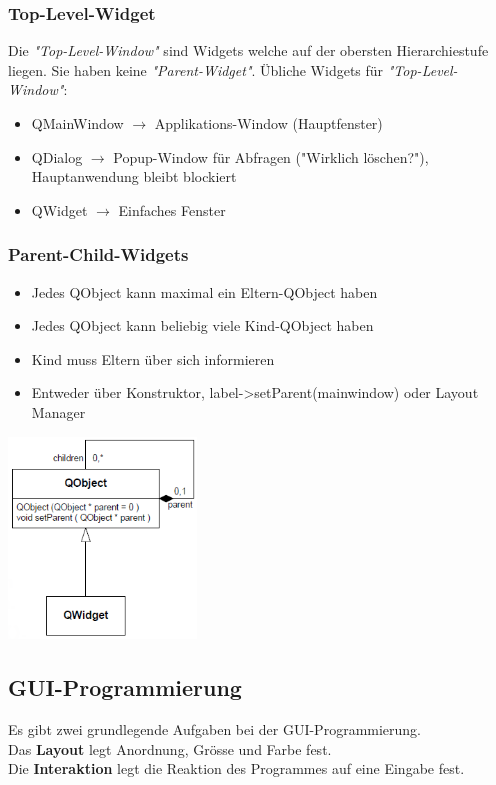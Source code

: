 \begin{multicols}{3}
\subsubsection{Top-Level-Widget}
Die \textit{"Top-Level-Window"} sind Widgets welche auf der obersten Hierarchiestufe liegen. Sie haben keine \textit{"Parent-Widget"}.\newline
Übliche Widgets für \textit{"Top-Level-Window"}: 
\begin{itemize}
	\item QMainWindow $\rightarrow$ Applikations-Window (Hauptfenster)
	\item QDialog $\rightarrow$ Popup-Window für Abfragen ("Wirklich löschen?"), Hauptanwendung bleibt blockiert
	\item QWidget $\rightarrow$ Einfaches Fenster
\end{itemize}

\subsubsection{Parent-Child-Widgets}
\begin{itemize}
	\item Jedes QObject kann maximal ein Eltern-QObject haben
	\item Jedes QObject kann beliebig viele \newline Kind-QObject haben
	\item Kind muss Eltern über sich informieren
	\item Entweder über Konstruktor, \newline label->setParent(mainwindow) oder Layout Manager
\end{itemize}

\includegraphics[width=5cm]{images/qt_parent_child.png}
\end{multicols}


\subsection{GUI-Programmierung}
Es gibt zwei grundlegende Aufgaben bei der GUI-Programmierung.\\
Das \textbf{Layout} legt Anordnung, Grösse  und Farbe fest.\\
Die \textbf{Interaktion} legt die Reaktion des Programmes auf eine Eingabe fest. \\

